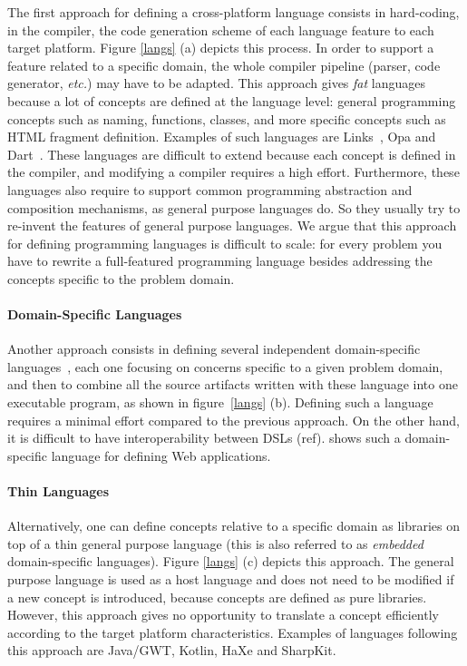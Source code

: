 \documentclass[preprint]{sigplanconf}
\newcommand{\etc}{\emph{etc.}}
\begin{document}
The first approach for defining a cross-platform language consists in hard-coding, in the compiler, the
code generation scheme of each language feature to each target platform. Figure \ref{langs} (a) depicts this
process. In order to support a feature related to a specific domain, the whole compiler pipeline (parser, code
generator, \etc) may have to be adapted. This approach gives \emph{fat} languages because a lot of concepts are
defined at the language level: general programming concepts such as naming, functions, classes, and more specific
concepts such as HTML fragment definition. Examples of such languages are Links~\cite{Cooper07_Links}, Opa and
Dart~\cite{Griffith11_Dart}. These languages are difficult to extend because each concept is defined in the compiler,
and modifying a compiler requires a high effort. Furthermore, these languages also require to support common
programming abstraction and composition mechanisms, as general purpose languages do. So they usually try to re-invent
the features of general purpose languages. We argue that this approach for defining programming languages is
difficult to scale: for every problem you have to rewrite a full-featured programming language besides addressing the
concepts specific to the problem domain.

\paragraph{Domain-Specific Languages}

Another approach consists in defining several independent domain-specific languages~\cite{Van00_DSL}, each one
focusing on concerns specific to a given problem domain, and then to combine all the source artifacts written with
these language into one executable program, as shown in figure~\ref{langs} (b). Defining such a language requires a
minimal effort compared to the previous approach. On the other hand, it is difficult to have interoperability between
DSLs (ref). \cite{Groenewegen08_WebDSL} shows such a domain-specific language for defining Web applications.

\paragraph{Thin Languages}

Alternatively, one can define concepts relative to a specific domain as libraries on top of a thin general purpose
language (this is also referred to as \emph{embedded} domain-specific languages). Figure \ref{langs} (c) depicts this
approach. The general purpose language is used as a host language and does not need to be modified if a new concept
is introduced, because concepts are defined as pure libraries. However, this approach gives no opportunity to
translate a concept efficiently according to the target platform characteristics. Examples of languages following
this approach are Java/GWT, Kotlin, HaXe and SharpKit.
\end{document}
